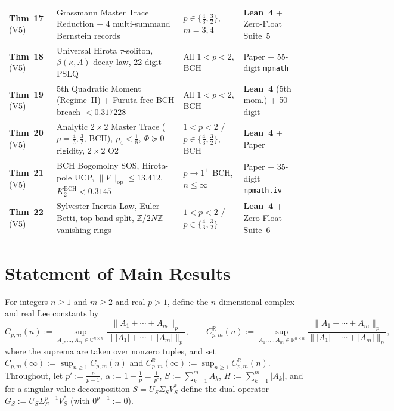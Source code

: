 \documentclass[10pt,letterpaper]{article}
\newcommand{\C}{\mathbb{C}}
\newcommand{\R}{\mathbb{R}}
\newcommand{\op}{\mathrm{op}}
\begin{document}
\begin{table}[htbp]
\begin{tabular}{@{}l >{\raggedright\arraybackslash}p{7.1cm} l >{\raggedright\arraybackslash}p{3.4cm}@{}}
\textbf{Thm~17} (V5) & Grassmann Master Trace Reduction + 4 multi-summand Bernstein records & $p\in\{\tfrac{4}{3},\tfrac{3}{2}\}$, $m=3, 4$ & \textbf{Lean~4} + Zero-Float Suite~5 \\
\textbf{Thm~18} (V5) & Universal Hirota $\tau$-soliton, $\beta(\kappa,\Lambda)$ decay law, 22-digit PSLQ & All $1<p<2$, BCH & Paper + 55-digit \texttt{mpmath} \\
\textbf{Thm~19} (V5) & 5th Quadratic Moment (Regime~II) + Furuta-free BCH breach $<0.317228$ & All $1<p<2$, BCH & \textbf{Lean~4} (5th mom.) + 50-digit \\
\textbf{Thm~20} (V5) & Analytic $2\times 2$ Master Trace ($p=\tfrac{4}{3},\tfrac{3}{2}$, BCH), $\rho_4<\tfrac{1}{8}$, $\Phi\succeq 0$ rigidity, $2\times 2$ O2 & $1<p<2$ / $p\in\{\tfrac{4}{3},\tfrac{3}{2}\}$, BCH & \textbf{Lean~4} + Paper \\
\textbf{Thm~21} (V5) & BCH Bogomolny SOS, Hirota-pole UCP, $\|V\|_{\op}\le 13.412$, $K_2^{\mathrm{BCH}}<0.3145$ & $p\to 1^+$ BCH, $n\le\infty$ & Paper + 35-digit \texttt{mpmath.iv} \\
\textbf{Thm~22} (V5) & Sylvester Inertia Law, Euler--Betti, top-band split, $\mathbb{Z}/2N\mathbb{Z}$ vanishing rings & $1<p<2$ / $p\in\{\tfrac{4}{3},\tfrac{3}{2}\}$ & \textbf{Lean~4} + Zero-Float Suite~6 \\
\bottomrule
\end{tabular}
\label{tab:roadmap}
\end{table}

\section{Statement of Main Results}

For integers $n \ge 1$ and $m \ge 2$ and real $p > 1$, define the $n$-dimensional complex and real Lee constants by
\begin{equation}\label{eq:defC}
  C_{p,m}(n) := \sup_{A_1,\dots,A_m \in \C^{n\times n}} \frac{\|A_1 + \cdots + A_m\|_p}{\||A_1| + \cdots + |A_m|\|_p},
  \qquad
  C_{p,m}^{\R}(n) := \sup_{A_1,\dots,A_m \in \R^{n\times n}} \frac{\|A_1 + \cdots + A_m\|_p}{\||A_1| + \cdots + |A_m|\|_p},
\end{equation}
where the suprema are taken over nonzero tuples, and set $C_{p,m}(\infty) := \sup_{n \ge 1} C_{p,m}(n)$ and $C_{p,m}^{\R}(\infty) := \sup_{n \ge 1} C_{p,m}^{\R}(n)$. Throughout, let $p' := \frac{p}{p-1}$, $\alpha := 1 - \frac{1}{p} = \frac{1}{p'}$, $S := \sum_{k=1}^m A_k$, $H := \sum_{k=1}^m |A_k|$, and for a singular value decomposition $S = U_S \Sigma_S V_S^*$ define the dual operator $G_S := U_S \Sigma_S^{p-1} V_S^*$ (with $0^{p-1} := 0$).
\end{document}
